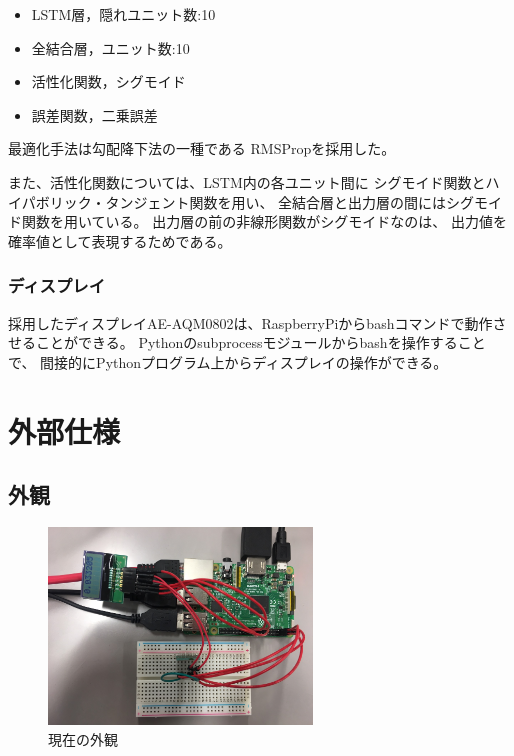 \documentclass{jsarticle}
\begin{document}
          \begin{itemize}
            \item LSTM層，隠れユニット数:10
            \item 全結合層，ユニット数:10
            \item 活性化関数，シグモイド
            \item 誤差関数，二乗誤差
          \end{itemize}

          最適化手法は勾配降下法の一種である
          RMSProp\cite{Hinton}を採用した。

          また、活性化関数については、LSTM内の各ユニット間に
          シグモイド関数とハイパボリック・タンジェント関数を用い、
          全結合層と出力層の間にはシグモイド関数を用いている。
          出力層の前の非線形関数がシグモイドなのは、
          出力値を確率値として表現するためである。

          
          
        \subsubsection{ディスプレイ}
        
          採用したディスプレイAE-AQM0802は、RaspberryPiからbashコマンドで動作させることができる。
          Pythonのsubprocessモジュールからbashを操作することで、
          間接的にPythonプログラム上からディスプレイの操作ができる。
      
    \newpage
    \section{外部仕様}
    
      \subsection{外観}
        \begin{figure}[htbp]
          \begin{center}
            \includegraphics[clip,width=7.0cm]{img/finish}
            \caption{現在の外観}
            \label{fig:finish}
          \end{center}
        \end{figure}
\end{document}
